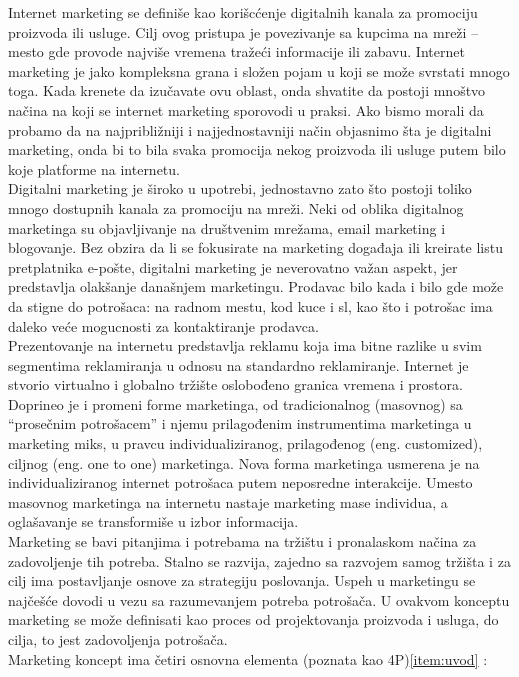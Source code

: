 \documentclass[a4paper]{article}
\begin{document}
{Internet marketing se definiše kao korišcćenje digitalnih kanala za promociju proizvoda ili usluge. Cilj ovog pristupa je povezivanje sa kupcima na mreži – mesto gde provode najviše vremena tražeći informacije ili zabavu. Internet marketing je jako kompleksna grana i složen pojam u koji se može svrstati mnogo toga. Kada krenete da izučavate ovu oblast, onda shvatite da postoji mnoštvo načina na koji se internet marketing sporovodi u praksi. Ako bismo morali da probamo da na najpribližniji i najjednostavniji način objasnimo šta je digitalni marketing, onda bi to bila svaka promocija nekog proizvoda ili usluge putem bilo koje platforme na internetu.
\\ Digitalni marketing je široko u upotrebi, jednostavno zato što postoji toliko mnogo dostupnih kanala za promociju na mreži. Neki od oblika digitalnog marketinga su objavljivanje na društvenim mrežama, email marketing i blogovanje. Bez obzira da li se fokusirate na marketing događaja ili kreirate listu pretplatnika e-pošte, digitalni marketing je neverovatno važan aspekt, jer predstavlja olakšanje današnjem marketingu. Prodavac bilo kada i bilo gde može da stigne do potrošaca: na radnom mestu, kod kuce i sl, kao što i potrošac ima daleko veće mogucnosti za kontaktiranje prodavca.
\\ Prezentovanje na internetu predstavlja reklamu koja ima bitne razlike u svim segmentima reklamiranja u odnosu na standardno reklamiranje.
Internet je stvorio virtualno i globalno tržište oslobođeno granica vremena i prostora. Doprineo je i promeni forme marketinga, od tradicionalnog (masovnog) sa “prosečnim potrošacem” i njemu prilagođenim instrumentima marketinga u marketing miks, u pravcu individualiziranog, prilagođenog (eng. customized), ciljnog (eng. one to one) marketinga. Nova forma marketinga usmerena je na individualiziranog internet potrošaca putem neposredne interakcije. Umesto masovnog marketinga na internetu nastaje marketing mase individua, a oglašavanje se transformiše u izbor informacija.
\\ Marketing se bavi pitanjima i potrebama na tržištu i pronalaskom načina za zadovoljenje tih potreba. Stalno se razvija, zajedno sa razvojem samog tržišta i za cilj ima postavljanje osnove za strategiju poslovanja. Uspeh u marketingu se najčešće dovodi u vezu sa razumevanjem potreba potrošača. U ovakvom konceptu marketing se može definisati kao proces od projektovanja proizvoda i usluga, do cilja, to jest zadovoljenja potrošača.
\\Marketing koncept ima četiri osnovna elementa (poznata kao 4P)\ref{item:uvod} :
}
\end{document}
